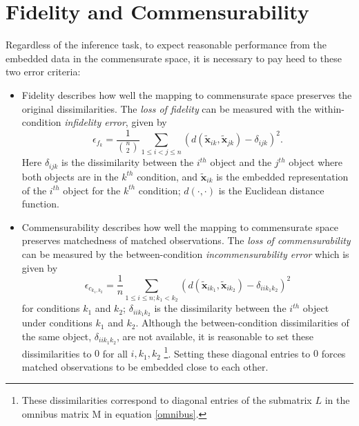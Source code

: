 \documentclass[12pt]{article} %
\begin{document}
\section{Fidelity and Commensurability\label{sec:FidComm}}



Regardless of the inference task,  to expect reasonable performance from the embedded data in the commensurate space, 
it is necessary to pay heed to these two error criteria: %

\begin{itemize}
\item Fidelity describes how well the mapping to commensurate space preserves the original dissimilarities. The \emph{loss of fidelity} can be measured with the  within-condition \emph{ infidelity error}, given by
    \[
\epsilon_{f_{k}} = \frac{1}{{{n}\choose{2}}} \sum_{1 \leq i < j \leq n} (d(\widetilde{\bm{x}}_{ik},\widetilde{\bm{x}}_{jk})-\delta_{ijk})^2
.\] 
Here $\delta_{ijk}$ is the dissimilarity between the $i^{th}$ object and the $j^{th}$ object where both objects are in the $k^{th}$  condition, and $\widetilde{\bm{x}}_{ik}$ is the embedded representation of the $i^{th}$ object  for the $k^{th}$ condition;  $d(\cdot,\cdot)$ is the Euclidean distance function.

\item Commensurability describes how well the mapping to commensurate space preserves matchedness of matched observations. The \emph{loss of commensurability} can be measured by the between-condition {\em incommensurability error} which is given by
    \[
\epsilon_{c_{k_1,k_2}} = \frac{1}{n} \sum_{1 \leq i \leq n;k_1 <k_2} (d(\widetilde{\bm{x}}_{ik_1},\widetilde{\bm{x}}_{ik_2})- { \delta_{iik_1k_2}})^2
\label{comm-error}
\]
 for conditions $k_1$ and $k_2$; $\delta_{iik_1k_2}$  is the dissimilarity between the $i^{th}$ object under  conditions   $k_1$ and  $k_2$. 
Although  the between-condition dissimilarities of the same object, ${ \delta_{iik_1k_2}}$, are not available,  it is reasonable to set these dissimilarities to $0$ for all $i,k_1,k_2$ \footnote{These dissimilarities correspond to  diagonal  entries of the  submatrix $L$ in  the omnibus matrix  M in equation \eqref{omnibus}. }. Setting these diagonal entries to $0$ forces matched observations to be embedded close to each other.  
\end{itemize}
\end{document}
